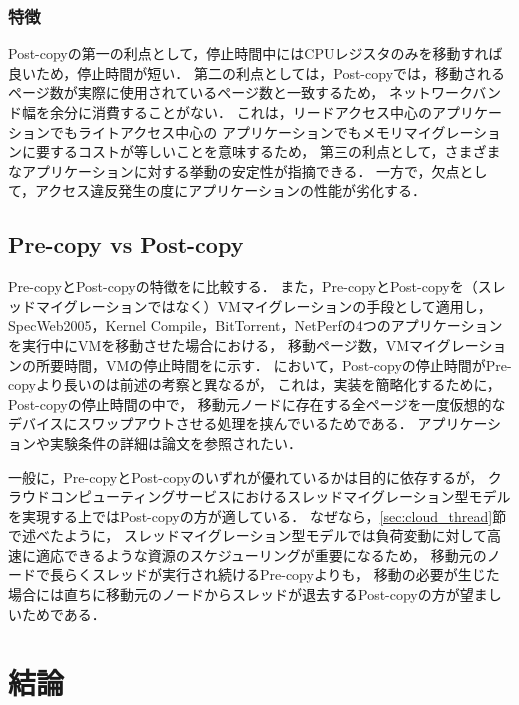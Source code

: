 \documentclass[10pt]{jsarticle}
\begin{document}
\subsubsection{特徴}

Post-copyの第一の利点として，停止時間中にはCPUレジスタのみを移動すれば良いため，停止時間が短い．
第二の利点としては，Post-copyでは，移動されるページ数が実際に使用されているページ数と一致するため，
ネットワークバンド幅を余分に消費することがない．
これは，リードアクセス中心のアプリケーションでもライトアクセス中心の
アプリケーションでもメモリマイグレーションに要するコストが等しいことを意味するため，
第三の利点として，さまざまなアプリケーションに対する挙動の安定性が指摘できる．
一方で，欠点として，アクセス違反発生の度にアプリケーションの性能が劣化する．

\subsection{Pre-copy vs Post-copy}

Pre-copyとPost-copyの特徴をに比較する．
また，Pre-copyとPost-copyを（スレッドマイグレーションではなく）VMマイグレーション\cite{t1,t2,t3}の手段として適用し，
SpecWeb2005，Kernel Compile，BitTorrent，NetPerfの4つのアプリケーションを実行中にVMを移動させた場合における，
移動ページ数，VMマイグレーションの所要時間，VMの停止時間をに示す．
において，Post-copyの停止時間がPre-copyより長いのは前述の考察と異なるが，
これは，実装を簡略化するために，Post-copyの停止時間の中で，
移動元ノードに存在する全ページを一度仮想的なデバイスにスワップアウトさせる処理を挟んでいるためである．
アプリケーションや実験条件の詳細は論文\cite{t1}を参照されたい．

一般に，Pre-copyとPost-copyのいずれが優れているかは目的に依存するが，
クラウドコンピューティングサービスにおけるスレッドマイグレーション型モデルを実現する上ではPost-copyの方が適している．
なぜなら，\ref{sec:cloud_thread}節で述べたように，
スレッドマイグレーション型モデルでは負荷変動に対して高速に適応できるような資源のスケジューリングが重要になるため，
移動元のノードで長らくスレッドが実行され続けるPre-copyよりも，
移動の必要が生じた場合には直ちに移動元のノードからスレッドが退去するPost-copyの方が望ましいためである．

\section{結論}
\label{sec:concl}
\end{document}
